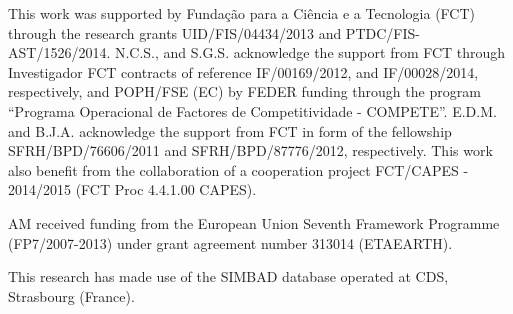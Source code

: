 \documentclass{aa}
\begin{document}
\begin{acknowledgements}

This work was supported by Funda\c{c}\~ao para a Ci\^encia e a Tecnologia (FCT)
through the research grants UID/FIS/04434/2013 and PTDC/FIS-AST/1526/2014.
N.C.S., and S.G.S. acknowledge the support from FCT through Investigador FCT
contracts of reference IF/00169/2012, and IF/00028/2014, respectively, and
POPH/FSE (EC) by FEDER funding through the program “Programa Operacional de
Factores de Competitividade - COMPETE”. E.D.M. and B.J.A. acknowledge the
support from FCT in form of the fellowship SFRH/BPD/76606/2011 and
SFRH/BPD/87776/2012, respectively. This work also benefit from the collaboration
of a cooperation project FCT/CAPES - 2014/2015 (FCT Proc 4.4.1.00 CAPES).

AM received funding from the European Union Seventh Framework Programme
(FP7/2007-2013) under grant agreement number 313014 (ETAEARTH).

This research has made use of the SIMBAD database operated at CDS, Strasbourg
(France).

\end{acknowledgements}




\end{document}
